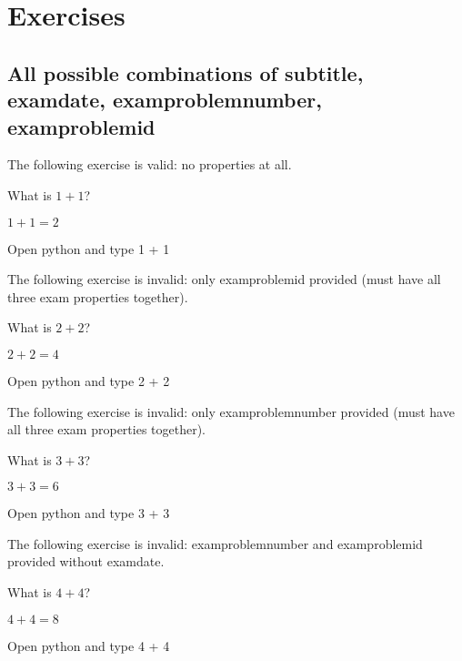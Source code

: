 \documentclass{book}
\begin{document}
\chapter{Exercises}

\section{All possible combinations of subtitle, examdate, examproblemnumber, examproblemid}

The following exercise is valid: no properties at all.

\begin{exercise}
  What is \(1 + 1\)?
\end{exercise}
\begin{solution}
  \(1 + 1 = 2\)
\end{solution}
\begin{additionalinformation}
Open python and type 1 + 1
\end{additionalinformation}

The following exercise is invalid: only examproblemid provided (must have all three exam properties together).

\begin{exercise}[examproblemid={2020-01-15-02}]
  What is \(2 + 2\)?
\end{exercise}
\begin{solution}
  \(2 + 2 = 4\)
\end{solution}
\begin{additionalinformation}
Open python and type 2 + 2
\end{additionalinformation}

The following exercise is invalid: only examproblemnumber provided (must have all three exam properties together).

\begin{exercise}[examproblemnumber={3}]
  What is \(3 + 3\)?
\end{exercise}
\begin{solution}
  \(3 + 3 = 6\)
\end{solution}
\begin{additionalinformation}
Open python and type 3 + 3
\end{additionalinformation}

The following exercise is invalid: examproblemnumber and examproblemid provided without examdate.

\begin{exercise}[examproblemnumber={4}, examproblemid={2020-01-15-04}]
  What is \(4 + 4\)?
\end{exercise}
\begin{solution}
  \(4 + 4 = 8\)
\end{solution}
\begin{additionalinformation}
Open python and type 4 + 4
\end{additionalinformation}
\end{document}
